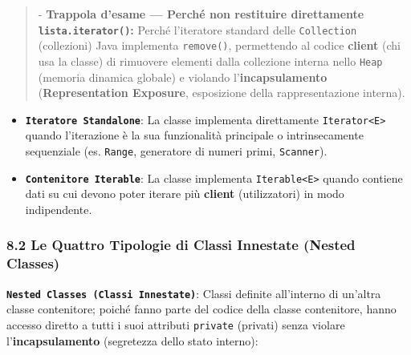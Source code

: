 \begin{quote}\small



- \textbf{Trappola d'esame — Perché non restituire direttamente \texttt{lista.iterator()}:} Perché l'iteratore standard delle \texttt{Collection} (collezioni) Java implementa \texttt{remove()}, permettendo al codice \textbf{client} (chi usa la classe) di rimuovere elementi dalla collezione interna nello \texttt{Heap} (memoria dinamica globale) e violando l'\textbf{incapsulamento} (\textbf{Representation Exposure}, esposizione della rappresentazione interna).

\end{quote}

\begin{itemize}

\item \textbf{\texttt{Iteratore Standalone}}: La classe implementa direttamente \texttt{Iterator<E>} quando l'iterazione è la sua funzionalità principale o intrinsecamente sequenziale (es. \texttt{Range}, generatore di numeri primi, \texttt{Scanner}).



\item \textbf{\texttt{Contenitore Iterable}}: La classe implementa \texttt{Iterable<E>} quando contiene dati su cui devono poter iterare più \textbf{client} (utilizzatori) in modo indipendente.

\end{itemize}

\subsubsection{8.2 Le Quattro Tipologie di Classi Innestate (Nested Classes)}\label{8-2-le-quattro-tipologie-di-classi-innestate-nested-classes}

\textbf{\texttt{Nested Classes (Classi Innestate)}}: Classi definite all'interno di un'altra classe contenitore; poiché fanno parte del codice della classe contenitore, hanno accesso diretto a tutti i suoi attributi \texttt{private} (privati) senza violare l'\textbf{incapsulamento} (segretezza dello stato interno):

